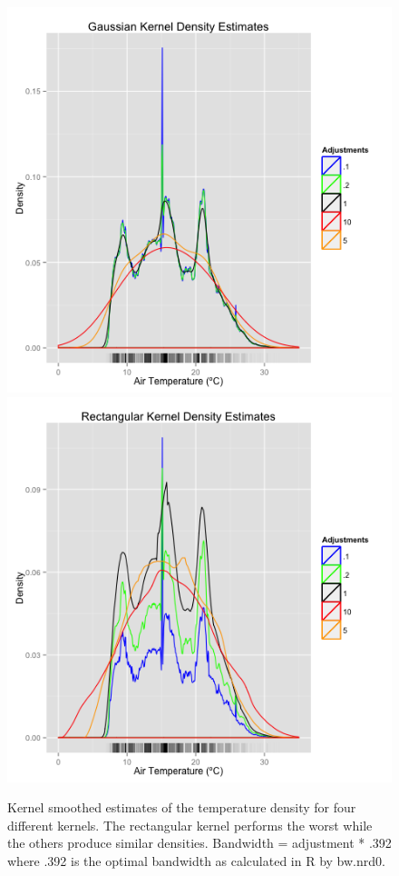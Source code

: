 \documentclass[english]{article}\usepackage{graphicx, color}
\numberwithin{equation}{section}
\numberwithin{figure}{section}
\begin{document}
\begin{figure}
\begin{center}
\includegraphics[scale = .4]{Temperature_Density_Guassian_Kernel.png}
\includegraphics[scale = .4]{Temperature_Density_Rectangular_Kernel.png}
\end{center}
\caption{Kernel smoothed estimates of the temperature density for four different kernels. The rectangular kernel performs the worst while the others produce similar densities. Bandwidth = adjustment * .392 where .392 is the optimal bandwidth as calculated in R by bw.nrd0.}
\end{figure}
\end{document}
